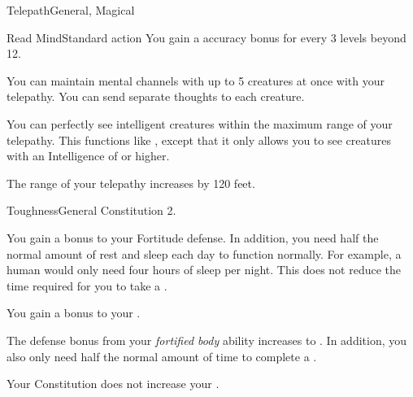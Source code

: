 \begin{magicalfeat}{Telepath}{General, Magical}
\begin{magicalsustainability}{Read Mind}{Standard action}
      \rankline
      You gain a  accuracy bonus for every 3 levels beyond 12.
    \end{magicalsustainability}

     You can maintain mental channels with up to 5 creatures at once with your telepathy.
    You can send separate thoughts to each creature.

     You can perfectly see intelligent creatures within the maximum range of your telepathy.
    This functions like , except that it only allows you to see creatures with an Intelligence of  or higher.

     The range of your telepathy increases by 120 feet.
  \end{magicalfeat}

  \begin{feat}{Toughness}{General}
    \featpre Constitution 2.

     You gain a  bonus to your Fortitude defense.
    In addition, you need half the normal amount of rest and sleep each day to function normally.
    For example, a human would only need four hours of sleep per night.
    This does not reduce the time required for you to take a .

     You gain a  bonus to your .

     The defense bonus from your \textit{fortified body} ability increases to .
    In addition, you also only need half the normal amount of time to complete a .

     Your Constitution does not increase your .
  \end{feat}

